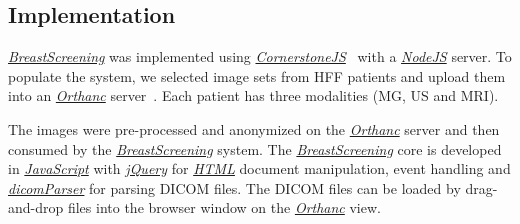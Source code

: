 \subsection{Implementation}

\hyperlink{https://breastscreening.github.io/}{{\it BreastScreening}} was implemented using \hyperlink{https://cornerstonejs.org/}{{\it CornerstoneJS}}~\cite{urban2017lesiontracker} with a \hyperlink{https://nodejs.org/}{{\it NodeJS}} server.
To populate the system, we selected image sets from HFF patients and upload them into an \hyperlink{https://www.orthanc-server.com/}{{\it Orthanc}} server~\cite{Jodogne2018}.
Each patient has three modalities (MG, US and MRI).

The images were pre-processed and anonymized on the \hyperlink{https://www.orthanc-server.com/}{{\it Orthanc}} server and then consumed by the \hyperlink{https://breastscreening.github.io/}{{\it BreastScreening}} system.
The \hyperlink{https://breastscreening.github.io/}{{\it BreastScreening}} core is developed in \hyperlink{https://www.w3schools.com/js/}{{\it JavaScript}} with \hyperlink{https://www.w3schools.com/jquery/}{{\it jQuery}} for \hyperlink{https://www.w3schools.com/html/}{{\it HTML}} document manipulation, event handling and \hyperlink{https://github.com/cornerstonejs/dicomParser}{{\it dicomParser}} for parsing DICOM files.
The DICOM files can be loaded by drag-and-drop files into the browser window on the \hyperlink{https://www.orthanc-server.com/}{{\it Orthanc}} view.